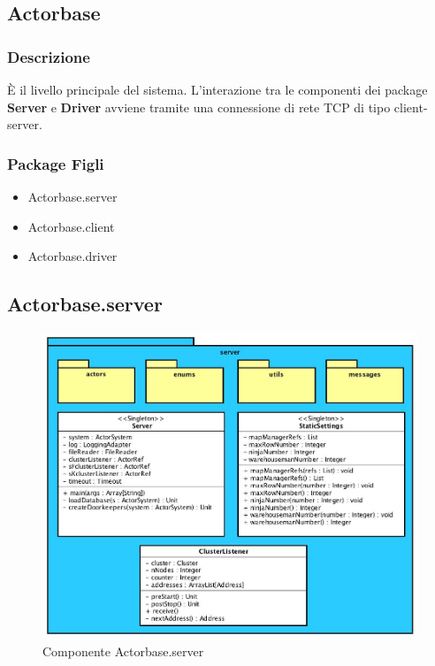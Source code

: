 \documentclass[a4paper]{article}
\begin{document}
		\subsection{Actorbase}
			
			\subsubsection{Descrizione}
				È il livello principale del sistema. L'interazione tra le componenti dei package \textbf{Server} e \textbf{Driver} avviene tramite una 
				connessione di rete TCP di tipo client-server.
				
			\subsubsection{Package Figli}
				\begin{itemize}
					\item Actorbase.server
					\item Actorbase.client
					\item Actorbase.driver
				\end{itemize}
				
		\subsection{Actorbase.server}
		
			\begin{figure}[H]
				\centering
				\includegraphics[width=\textwidth]{ST/Server/serverLevel.jpg}
				\caption{Componente Actorbase.server}
			\end{figure}
\end{document}
